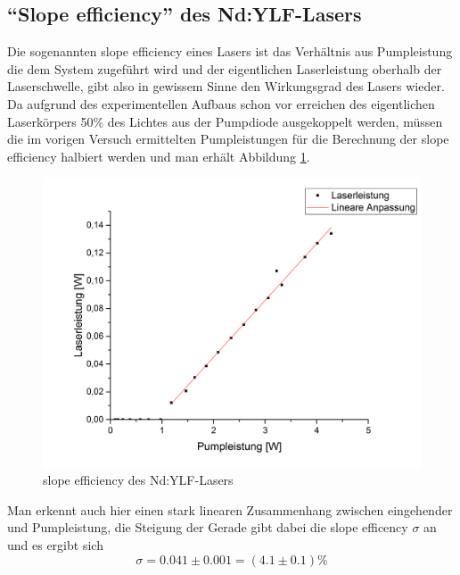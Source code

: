 \subsection{"`Slope efficiency"' des Nd:YLF-Lasers}
Die sogenannten slope efficiency eines Lasers ist das Verhältnis aus Pumpleistung die dem System zugeführt wird und der eigentlichen Laserleistung oberhalb der Laserschwelle, gibt also in gewissem Sinne den Wirkungsgrad des Lasers wieder. Da aufgrund des experimentellen Aufbaus schon vor erreichen des eigentlichen Laserkörpers 50\% des Lichtes aus der Pumpdiode ausgekoppelt werden, müssen die im vorigen Versuch ermittelten Pumpleistungen für die Berechnung der slope efficiency halbiert werden und man erhält Abbildung \ref{slope}.
\begin{figure}[H]
	\begin{center}
		\includegraphics[scale=.5]{Bilder/slope.png}
		\caption{slope efficiency des Nd:YLF-Lasers}
		\label{slope}
	\end{center}
\end{figure}
Man erkennt auch hier einen stark linearen Zusammenhang zwischen eingehender und Pumpleistung, die Steigung der Gerade gibt dabei die slope efficency $\sigma$ an und es ergibt sich
\begin{equation}
\sigma=0.041\pm0.001=(4.1\pm0.1)\%
\end{equation}
